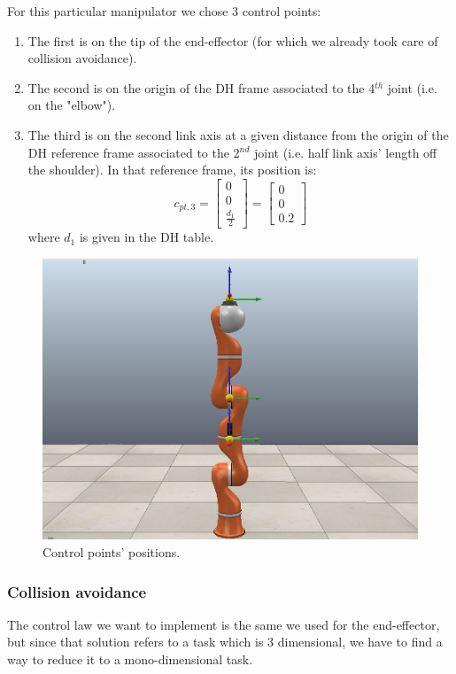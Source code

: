 \documentclass[12pt, a4paper]{article}
\begin{document}
For this particular manipulator we chose 3 control points:
\begin{enumerate}
\item The first is on the tip of the end-effector (for which we already took care of collision avoidance).
\item The second is on the origin of the DH frame associated to the 4$^{th}$ joint (i.e. on the "elbow").
\item The third is on the second link axis at a given distance from the origin of the DH reference frame associated to the 2$^{nd}$ joint (i.e. half link axis' length off the shoulder). In that reference frame, its position is:
\[c_{pt,3} = \begin{bmatrix}
0\\0\\ \frac{d_1}{2}
\end{bmatrix} = \begin{bmatrix}
0\\0\\ 0.2
\end{bmatrix}
\] where $d_1$ is given in the DH table.
\end{enumerate}
\begin{figure}[H]
\centering
\includegraphics[scale=.3]{./plots/KUKA_CPS.png}
\caption{Control points' positions.}
\end{figure}
\subsubsection{Collision avoidance}

The control law we want to implement is the same we used for the end-effector, but since that solution refers to a task which is 3 dimensional, we have to find a way to reduce it to a mono-dimensional task.
\end{document}
